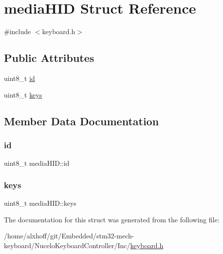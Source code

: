 \hypertarget{structmediaHID}{}\section{media\+H\+ID Struct Reference}
\label{structmediaHID}


{\ttfamily \#include $<$keyboard.\+h$>$}

\subsection*{Public Attributes}
\begin{DoxyCompactItemize}
\item 
uint8\+\_\+t \hyperlink{structmediaHID_acb241cd249b9115e95be210dd3832da8}{id}
\item 
uint8\+\_\+t \hyperlink{structmediaHID_afdb0783d63ec1bc175ec304efd8866b3}{keys}
\end{DoxyCompactItemize}


\subsection{Member Data Documentation}
\mbox{\label{structmediaHID_acb241cd249b9115e95be210dd3832da8}} 
\subsubsection{\texorpdfstring{id}{id}}
{\footnotesize\ttfamily uint8\+\_\+t media\+H\+I\+D\+::id}

\mbox{\label{structmediaHID_afdb0783d63ec1bc175ec304efd8866b3}} 
\subsubsection{\texorpdfstring{keys}{keys}}
{\footnotesize\ttfamily uint8\+\_\+t media\+H\+I\+D\+::keys}



The documentation for this struct was generated from the following file\+:\begin{DoxyCompactItemize}
\item 
/home/alxhoff/git/\+Embedded/stm32-\/mech-\/keyboard/\+Nucelo\+Keyboard\+Controller/\+Inc/\hyperlink{keyboard_8h}{keyboard.\+h}\end{DoxyCompactItemize}

